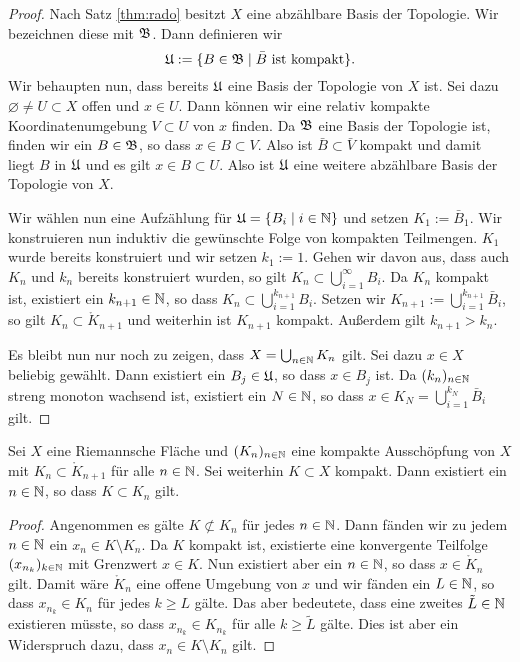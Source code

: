 \begin{proof}
  Nach Satz \ref{thm:rado} besitzt $X$ eine abzählbare Basis der
  Topologie. Wir bezeichnen diese mit $\mathfrak{B}$. Dann definieren wir
  \[
  \mathfrak{U} := \{ B \in \mathfrak{B} \mid \bar B \text{ ist kompakt}\}.
  \]
  Wir behaupten nun, dass bereits $\mathfrak{U}$ eine Basis der Topologie von
  $X$ ist. Sei dazu $\varnothing \neq U \subset X$ offen und $x \in U$. Dann
  können wir eine relativ kompakte Koordinatenumgebung $V \subset U$
  von $x$ finden. Da $\mathfrak{B}$ eine Basis der Topologie ist, finden wir
  ein $B \in \mathfrak{B}$, so dass $x \in B \subset V$. Also ist $\bar B
  \subset \bar V$ kompakt und damit liegt $B$ in $\mathfrak{U}$ und es gilt $x
  \in B \subset U$. Also ist $\mathfrak{U}$ eine weitere abzählbare Basis der
  Topologie von $X$.

  Wir wählen nun eine Aufzählung für $\mathfrak{U} = \{B_i \mid i \in \mathbb{N}\}$ und
  setzen $K_1 := \bar B_1$. Wir konstruieren nun induktiv die
  gewünschte Folge von kompakten Teilmengen. $K_1$ wurde bereits
  konstruiert und wir setzen $k_1 := 1$. Gehen wir davon aus, dass auch
  $K_n$ und $k_n$ bereits
  konstruiert wurden, so gilt $K_n \subset \bigcup_{i=1}^\infty
  B_i$. Da $K_n$ kompakt ist, existiert ein \break$k_{n+1} \in \mathbb{N}$, so dass $K_n
  \subset \bigcup_{i=1}^{k_{n+1}} B_i$. Setzen wir $K_{n+1} :=
  \bigcup_{i=1}^{k_{n+1}}\bar B_i$, so gilt $K_n \subset \mathring
  K_{n+1}$ und weiterhin ist $K_{n+1}$ kompakt. Außerdem gilt
  $k_{n+1} > k_n$.

  Es bleibt nun nur noch zu zeigen, dass $X = \bigcup_{n \in \mathbb{N}} K_n$
  gilt. Sei dazu $x \in X$ beliebig gewählt. Dann existiert ein $B_j \in
  \mathfrak{U}$, so dass $x \in B_j$ ist. Da $(k_n)_{n \in\mathbb{N}}$ streng monoton
  wachsend ist, existiert ein $N \in \mathbb{N}$, so dass $x \in K_N =
  \bigcup_{i=1}^{k_N} \bar B_i$ gilt.
\end{proof}

\begin{lemma}
  \label{lemma:kompakt-in-ausschöpfung}
  Sei $X$ eine Riemannsche Fläche und $(K_n)_{n \in \mathbb{N}}$ eine kompakte
  Ausschöpfung von $X$ mit $K_n \subset \mathring K_{n+1}$ für alle $n
  \in \mathbb{N}$. Sei weiterhin $K \subset X$ kompakt. Dann existiert ein $n
  \in \mathbb{N}$, so dass $K \subset K_n$ gilt.
\end{lemma}

\begin{proof}
  Angenommen es gälte $K \not \subset K_n$ für jedes $n \in \mathbb{N}$. Dann
  fänden wir zu jedem $n \in \mathbb{N}$ ein $x_n \in K\setminus K_n$. Da $K$
  kompakt ist, existierte eine konvergente Teilfolge $(x_{n_k})_{k\in
    \mathbb{N}}$ mit Grenzwert $x \in K$. Nun existiert aber ein $n \in \mathbb{N}$,
  so dass $x \in \mathring K_n$ gilt. Damit wäre $\mathring K_n$ eine offene
  Umgebung von $x$ und wir fänden ein $L \in \mathbb{N}$, so dass $x_{n_k} \in
  K_n$ für jedes $k\geq L$ gälte. Das aber bedeutete, dass eine
  zweites $\tilde L \in \mathbb{N}$ existieren müsste, so dass $x_{n_k} \in K_{n_k}$
  für alle $k \geq \tilde L$ gälte. Dies ist aber ein Widerspruch dazu,
  dass $x_n \in K \setminus K_n$ gilt.
\end{proof}


